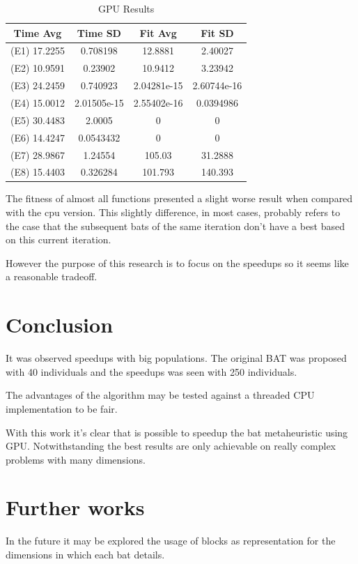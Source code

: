 \documentclass[conference]{IEEEtran}
\begin{document}
\begin{table}[!t]
    \renewcommand{\arraystretch}{1.3}
    \caption{GPU Results}
    \label{results-gpu}
    \centering
    \begin{tabular}{c|c|c|c}
    \hline
        Time Avg & Time SD & Fit Avg & Fit SD\\
    \hline
        (E1) 17.2255  & 0.708198 &  12.8881 & 2.40027 \\
        (E2) 10.9591  & 0.23902 & 10.9412 & 3.23942 \\
        (E3) 24.2459  & 0.740923  & 2.04281e-15 & 2.60744e-16 \\
        (E4) 15.0012 & 2.01505e-15 & 2.55402e-16 & 0.0394986 \\
        (E5) 30.4483  & 2.0005    & 0 & 0 \\
        (E6) 14.4247 & 0.0543432 & 0 & 0 \\
        (E7) 28.9867 & 1.24554 & 105.03 & 31.2888 \\
        (E8) 15.4403 & 0.326284 & 101.793 & 140.393 \\
    \end{tabular}
\end{table}

The fitness of almost all functions presented a slight worse result
when compared with the cpu version. This slightly difference, in most
cases, probably refers to the case that the subsequent bats of the same
iteration don't have a best based on this current iteration.

However the purpose of this research is to focus on the speedups so it
seems like a reasonable tradeoff.

\section{Conclusion} %
It was observed speedups with big populations. The original BAT was
proposed with 40 individuals and the speedups was seen with 250
individuals.

The advantages of the algorithm may be tested against a threaded CPU
implementation to be fair.

With this work it's clear that is possible to speedup the bat
metaheuristic using GPU. Notwithstanding the best results are only
achievable on really complex problems with many dimensions.
\section{Further works} %
In the future it may be explored the usage of blocks as representation
for the dimensions in which each bat details.
\end{document}
